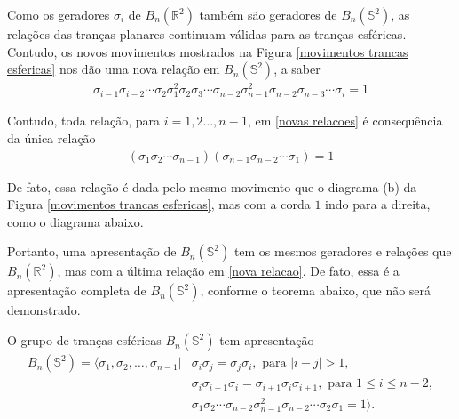 	\par\vspace{0.3cm} Como os geradores $\sigma_i$ de $B_n(\mathbb{R}^2)$ também são geradores de $B_n(\mathbb{S}^2)$, as relações das tranças planares continuam válidas para as tranças esféricas. Contudo, os novos movimentos mostrados na Figura \eqref{movimentos trancas esfericas} nos dão uma nova relação em $B_n(\mathbb{S}^2)$, a saber
	\begin{align}
	\sigma_{i-1}\sigma_{i-2}\cdots\sigma_2\sigma_1^2\sigma_2\sigma_3\cdots\sigma_{n-2}\sigma_{n-1}^2\sigma_{n-2}\sigma_{n-3}\cdots\sigma_i = 1
	\label{novas relacoes}
	\end{align}
	\par\vspace{0.3cm} Contudo, toda relação, para $i=1,2\dots,n-1$, em \eqref{novas relacoes} é consequência da única relação
	\begin{align}
	(\sigma_1\sigma_2\cdots\sigma_{n-1})(\sigma_{n-1}\sigma_{n-2}\cdots\sigma_1) = 1
	\label{nova relacao}
	\end{align}
	\par\vspace{0.3cm} De fato, essa relação é dada pelo mesmo movimento que o diagrama (b) da Figura \eqref{movimentos trancas esfericas}, mas com a corda $1$ indo para a direita, como o diagrama abaixo.
	\begin{center}
	\end{center}
	\par\vspace{0.3cm} Portanto, uma apresentação de $B_n(\mathbb{S}^2)$ tem os mesmos geradores e relações que $B_n(\mathbb{R}^2)$, mas com a última relação em \eqref{nova relacao}. De fato, essa é a apresentação completa de $B_n(\mathbb{S}^2)$, conforme o teorema abaixo, que não será demonstrado.
	
	\begin{theorem}
		\label{apresentacao de B_n(S^2)}
		O grupo de tranças esféricas $B_n(\mathbb{S}^2)$ tem apresentação	
		\begin{align*}
		B_n(\mathbb{S}^2) = \langle \sigma_1, \sigma_2, \dots, \sigma_{n-1}|&\sigma_i\sigma_j = \sigma_j\sigma_i, \text{ para } |i - j|>1, \\ 
		&\sigma_i\sigma_{i+1}\sigma_i = \sigma_{i+1}\sigma_i\sigma_{i+1}, \text{ para } 1\leq i\leq n-2 , \\
		&\sigma_1\sigma_2\cdots\sigma_{n-2}\sigma_{n-1}^2\sigma_{n-2}\cdots\sigma_2\sigma_1 = 1  \rangle.
		\end{align*} 
	\end{theorem}  
	
